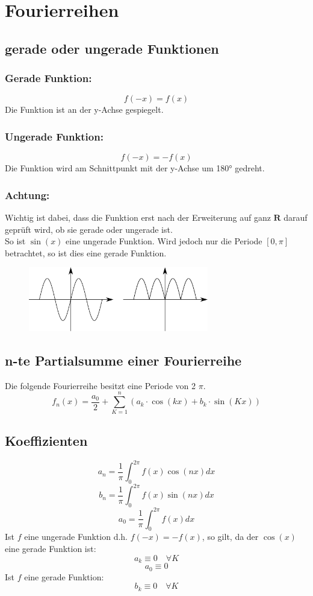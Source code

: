 \section{Fourierreihen}

\subsection{gerade oder ungerade Funktionen}

\subsubsection{Gerade Funktion: }
\[ \boxed{f(-x) = f(x)} \]
Die Funktion ist an der y-Achse gespiegelt. 
\subsubsection{Ungerade Funktion: }
\[ \boxed{f(-x) = -f(x)} \]
Die Funktion wird am Schnittpunkt mit der y-Achse um 180° gedreht. 
\subsubsection{Achtung: }
Wichtig ist dabei, dass die Funktion erst nach der Erweiterung auf ganz $\mathbf{R}$ darauf geprüft wird, ob sie gerade oder ungerade ist. \\
So ist $\sin(x)$ eine ungerade Funktion. Wird jedoch nur die Periode $[0, \pi]$ betrachtet, so ist dies eine gerade Funktion. 

\begin{figure}[h!]
\centering
\includegraphics[width=0.7\textwidth]{geradeungerade.pdf}
\end{figure}

\subsection{n-te Partialsumme einer Fourierreihe}
Die folgende Fourierreihe besitzt eine Periode von 2 $\pi$. 
\[ \boxed{f_n(x) = \frac{a_0}{2} + \sum_{K=1}^n \left(a_k \cdot \cos(kx) + b_k \cdot \sin(Kx)\right)} \]

\subsection{Koeffizienten}
\[ \boxed{a_n = \frac{1}{\pi} \int_0^{2 \pi} f(x) \cos(nx) dx} \]
\[ \boxed{b_n = \frac{1}{\pi} \int_0^{2 \pi} f(x) \sin(nx) dx} \]
\[ \boxed{a_0 = \frac{1}{\pi} \int_0^{2 \pi} f(x) dx
} \]
Ist $f$ eine ungerade Funktion d.h. $f(-x) = -f(x)$, so gilt, da der $\cos(x)$ eine gerade Funktion ist: 
\[ a_k \equiv 0 \quad \forall K\]
\[ a_0 \equiv 0 \]
Ist $f$ eine gerade Funktion: 
\[ b_k \equiv 0 \quad \forall K \]

